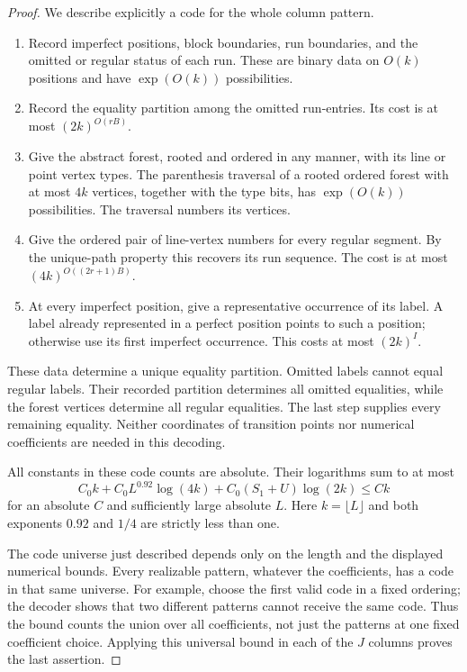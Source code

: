 \begin{proof}
We describe explicitly a code for the whole column pattern.
\begin{enumerate}
\item Record imperfect positions, block boundaries, run boundaries,
and the omitted or regular status of each run.  These are binary
data on $O(k)$ positions and have $\exp(O(k))$ possibilities.
\item Record the equality partition among the omitted run-entries.
Its cost is at most $(2k)^{O(rB)}$.
\item Give the abstract forest, rooted and ordered in any manner,
with its line or point vertex types.  The parenthesis traversal of
a rooted ordered forest with at most $4k$ vertices, together with
the type bits, has $\exp(O(k))$ possibilities.  The traversal numbers
its vertices.
\item Give the ordered pair of line-vertex numbers for every regular
segment.  By the unique-path property this recovers its run sequence.
The cost is at most $(4k)^{O((2r+1)B)}$.
\item At every imperfect position, give a representative occurrence
of its label.  A label already represented in a perfect position
points to such a position; otherwise use its first imperfect
occurrence.  This costs at most $(2k)^I$.
\end{enumerate}
These data determine a unique equality partition.  Omitted labels
cannot equal regular labels.  Their recorded partition determines
all omitted equalities, while the forest vertices determine all
regular equalities.  The last step supplies every remaining equality.
Neither coordinates of transition points nor numerical coefficients
are needed in this decoding.

All constants in these code counts are absolute.  Their logarithms
sum to at most
\[
 C_0k+C_0L^{0.92}\log(4k)
       +C_0(S_1+U)\log(2k)\le Ck
\]
for an absolute $C$ and sufficiently large absolute $L$.  Here
$k=\lfloor L\rfloor$ and both exponents $0.92$ and $1/4$ are
strictly less than one.

The code universe just described depends only on the length and
the displayed numerical bounds.  Every realizable pattern, whatever
the coefficients, has a code in that same universe.  For example,
choose the first valid code in a fixed ordering; the decoder shows
that two different patterns cannot receive the same code.  Thus the
bound counts the union over all coefficients, not just the patterns
at one fixed coefficient choice.  Applying this universal bound in
each of the $J$ columns proves the last assertion.
\end{proof}


